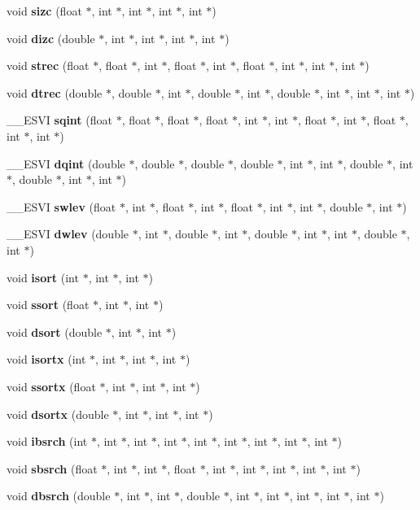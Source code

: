 \begin{CompactItemize}
\item 
void {\bf sizc} (float $\ast$, int $\ast$, int $\ast$, int $\ast$, int $\ast$)
\item 
void {\bf dizc} (double $\ast$, int $\ast$, int $\ast$, int $\ast$, int $\ast$)
\item 
void {\bf strec} (float $\ast$, float $\ast$, int $\ast$, float $\ast$, int $\ast$, float $\ast$, int $\ast$, int $\ast$, int $\ast$)
\item 
void {\bf dtrec} (double $\ast$, double $\ast$, int $\ast$, double $\ast$, int $\ast$, double $\ast$, int $\ast$, int $\ast$, int $\ast$)
\item 
\_\-\_\-ESVI {\bf sqint} (float $\ast$, float $\ast$, float $\ast$, float $\ast$, int $\ast$, int $\ast$, float $\ast$, int $\ast$, float $\ast$, int $\ast$, int $\ast$)
\item 
\_\-\_\-ESVI {\bf dqint} (double $\ast$, double $\ast$, double $\ast$, double $\ast$, int $\ast$, int $\ast$, double $\ast$, int $\ast$, double $\ast$, int $\ast$, int $\ast$)
\item 
\_\-\_\-ESVI {\bf swlev} (float $\ast$, int $\ast$, float $\ast$, int $\ast$, float $\ast$, int $\ast$, int $\ast$, double $\ast$, int $\ast$)
\item 
\_\-\_\-ESVI {\bf dwlev} (double $\ast$, int $\ast$, double $\ast$, int $\ast$, double $\ast$, int $\ast$, int $\ast$, double $\ast$, int $\ast$)
\item 
void {\bf isort} (int $\ast$, int $\ast$, int $\ast$)
\item 
void {\bf ssort} (float $\ast$, int $\ast$, int $\ast$)
\item 
void {\bf dsort} (double $\ast$, int $\ast$, int $\ast$)
\item 
void {\bf isortx} (int $\ast$, int $\ast$, int $\ast$, int $\ast$)
\item 
void {\bf ssortx} (float $\ast$, int $\ast$, int $\ast$, int $\ast$)
\item 
void {\bf dsortx} (double $\ast$, int $\ast$, int $\ast$, int $\ast$)
\item 
void {\bf ibsrch} (int $\ast$, int $\ast$, int $\ast$, int $\ast$, int $\ast$, int $\ast$, int $\ast$, int $\ast$, int $\ast$)
\item 
void {\bf sbsrch} (float $\ast$, int $\ast$, int $\ast$, float $\ast$, int $\ast$, int $\ast$, int $\ast$, int $\ast$, int $\ast$)
\item 
void {\bf dbsrch} (double $\ast$, int $\ast$, int $\ast$, double $\ast$, int $\ast$, int $\ast$, int $\ast$, int $\ast$, int $\ast$)

\end{CompactItemize}
